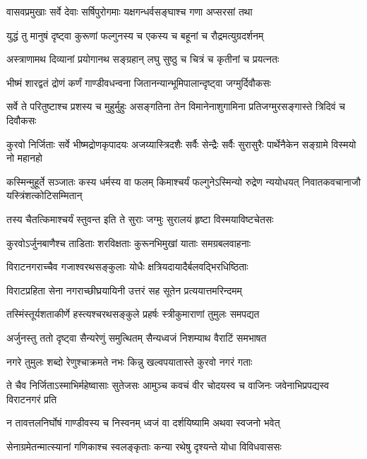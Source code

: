 \twolineshloka
{वासवप्रमुखाः सर्वे देवाः सर्षिपुरोगमाः}
{यक्षगन्धर्वसङ्घाश्च गणा अप्सरसां तथा}


\twolineshloka
{युद्धं तु मानुषं दृष्ट्वा कुरूणां फल्गुनस्य च}
{एकस्य च बहूनां च रौद्रमत्युग्रदर्शनम्}


\twolineshloka
{अस्त्राणामथ दिव्यानां प्रयोगानथ सङ्ग्रहान्}
{लघु सुष्ठु च चित्रं च कृतीनां च प्रयत्नतः}


\twolineshloka
{भीष्मं शारद्वतं द्रोणं कर्णं गाण्डीवधन्वना}
{जितानन्यान्भूमिपालान्दृष्ट्वा जग्मुर्दिवौकसः}


\threelineshloka
{सर्वे ते परितुष्टाश्च प्रशस्य च मुहुर्मुहुः}
{असङ्गतिना तेन विमानेनाशुगामिना}
{प्रतिजग्मुरसङ्गास्ते त्रिदिवं च दिवौकसः}


\threelineshloka
{कुरवो निर्जिताः सर्वे भीष्मद्रोणकृपादयः}
{अजय्यास्त्रिदशैः सर्वैः सेन्द्रैः सर्वैः सुरासुरैः}
{पार्थेनैकेन सङ्ग्रामे विस्मयो नो महानहो}


\onelineshloka
{कस्मिन्मुहूर्ते सञ्जातः कस्य धर्मस्य वा फलम्}
\twolineshloka
{किमाश्चर्यं फल्गुनेऽस्मिन्यो रुद्रेण न्ययोधयत्}
{निवातकवचानाजौ यस्त्रिंशत्कोटिसम्मितान्}


\twolineshloka
{तस्य चैतत्किमाश्चर्यं स्तुवन्त इति ते सुराः}
{जग्मुः सुरालयं हृष्टा विस्मयाविष्टचेतसः}


\twolineshloka
{कुरवोऽर्जुनबाणैश्च ताडिताः शरविक्षताः}
{कुरूनभिमुखां याताः समग्रबलवाहनाः}


\twolineshloka
{विराटनगराच्चैव गजाश्वरथसङ्कुलाः}
{योधैः क्षत्रियदायादैर्बलवद्भिरधिष्ठिताः}


\twolineshloka
{विराटप्रहिता सेना नगराच्छीघ्रयायिनी}
{उत्तरं सह सूतेन प्रत्ययात्तमरिन्दमम्}


\twolineshloka
{तस्मिंस्तूर्यशताकीर्णे हस्त्यश्चरथसङ्कुले}
{प्रहर्षः स्त्रीकुमाराणां तुमुलः समपद्यत}


\twolineshloka
{अर्जुनस्तु ततो दृष्ट्वा सैन्यरेणुं समुत्थितम्}
{सैन्यध्वजं निशम्याथ वैराटिं समभाषत}


\twolineshloka
{नगरे तुमुलः शब्दो रेणुश्चाक्रमते नभः}
{किन्नु खल्वपयातास्ते कुरवो नगरं गताः}


\threelineshloka
{ते चैव निर्जिताऽस्माभिर्महेष्वासाः सुतेजसः}
{आमुञ्च कवचं वीर चोदयस्व च वाजिनः}
{जवेनाभिप्रपद्यस्व विराटनगरं प्रति}


\twolineshloka
{न तावत्तलनिर्घोषं गाण्डीवस्य च निस्वनम्}
{ध्वजं वा दर्शयिष्यामि अथवा स्वजनो भवेत्}




\twolineshloka
{सेनाग्रमेतन्मात्स्यानां गणिकाश्च स्वलङ्कृताः}
{कन्या रथेषु दृश्यन्ते योधा विविधवाससः}



